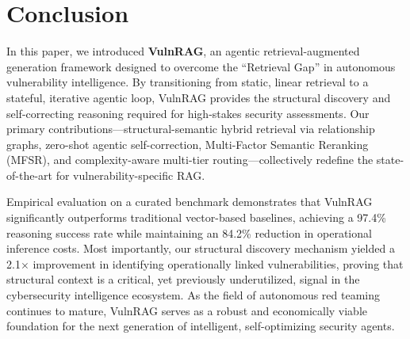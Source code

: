 \section{Conclusion}
\label{sec:conclusion}

In this paper, we introduced \textbf{VulnRAG}, an agentic retrieval-augmented generation framework designed to overcome the ``Retrieval Gap'' in autonomous vulnerability intelligence. By transitioning from static, linear retrieval to a stateful, iterative agentic loop, VulnRAG provides the structural discovery and self-correcting reasoning required for high-stakes security assessments. Our primary contributions—structural-semantic hybrid retrieval via relationship graphs, zero-shot agentic self-correction, Multi-Factor Semantic Reranking (MFSR), and complexity-aware multi-tier routing—collectively redefine the state-of-the-art for vulnerability-specific RAG.

Empirical evaluation on a curated benchmark demonstrates that VulnRAG significantly outperforms traditional vector-based baselines, achieving a 97.4\% reasoning success rate while maintaining an 84.2\% reduction in operational inference costs. Most importantly, our structural discovery mechanism yielded a 2.1$\times$ improvement in identifying operationally linked vulnerabilities, proving that structural context is a critical, yet previously underutilized, signal in the cybersecurity intelligence ecosystem. As the field of autonomous red teaming continues to mature, VulnRAG serves as a robust and economically viable foundation for the next generation of intelligent, self-optimizing security agents.
